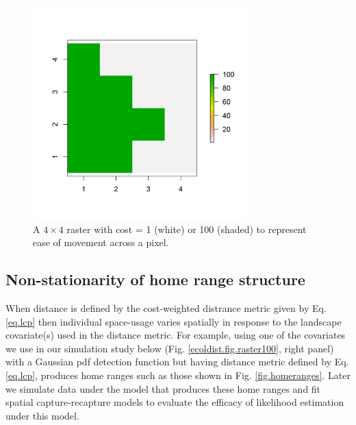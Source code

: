 \documentclass[12pt]{article}
\begin{document}
\begin{figure}
\begin{center}
\includegraphics[height=3.25in,width=3.25in]{figs/raster_2values}
\end{center}
\caption{A $4 \times 4$ raster with cost = 1 (white) or 100 (shaded) to represent ease of movement across a pixel.}
\label{ecoldist.fig.raster}
\end{figure}

\subsection{Non-stationarity of home range structure}

When distance is defined by the cost-weighted distrance metric given
by Eq. \ref{eq.lcp} then individual space-usage varies
spatially in response to the landscape covariate(s) used in the
distance metric. For example, using one of the covariates we use in
our simulation study below (Fig. \ref{ecoldist.fig.raster100}, right
panel) with a Gaussian pdf detection function but having distance
metric defined by Eq. \ref{eq.lcp}, produces home ranges such
as those shown in Fig. \ref{fig.homeranges}. Later we simulate data
under the model that produces these home ranges and fit spatial
capture-recapture models to evaluate the efficacy of likelihood
estimation under this model. 
\end{document}
